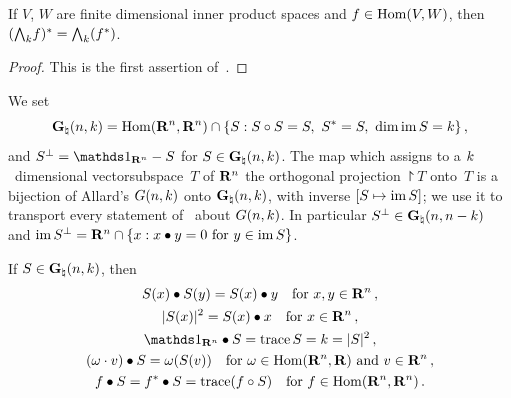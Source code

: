 \begin{lemma}
    \label{al:2.2(2)}
    If $V$, $W$ are finite dimensional inner product spaces and $f \in \operatorname{Hom}(V,W)$, then
    $({\textstyle\boldsymbol{\bigwedge}}_{{k}} f)^{*} = {\textstyle\boldsymbol{\bigwedge}}_{{k}} (f^{*})$.
\end{lemma}

\begin{proof}
    This is the first assertion of~\cite[1.7.6]{Federer1969}.
\end{proof}

\begin{definition}
    \label{al:2.3}
    We set
    \begin{displaymath}
        \mathbf{G}_{\natural}(n,k) = \operatorname{Hom}(\mathbf{R}^{n},\mathbf{R}^{n}) \cap \{ S : S \circ S = S,\
        S^{*} = S,\ \dim \operatorname{im} S = k \} \,,
    \end{displaymath}
    and $S^\perp = \id{\R^{\adim}} - S$ for $S \in \mathbf{G}_{\natural}(n,k)$. The map which assigns
    to a $k$~dimensional vectorsubspace~$T$ of $\mathbf{R}^{n}$ the orthogonal projection
    $\project{T}$ onto~$T$ is a bijection of Allard's $G(n,k)$ onto
    $\mathbf{G}_{\natural}(n,k)$, with inverse $[S \mapsto \operatorname{im} S]$; we use it to transport every
    statement of~\cite{Allard1972} about $G(n,k)$. In particular $S^\perp \in
    \mathbf{G}_{\natural}(n,n-k)$ and $\operatorname{im} S^\perp = \mathbf{R}^{n} \cap \{ x : x \bullet y = 0
    \text{ for } y \in \operatorname{im} S \}$.
\end{definition}

\begin{lemma}
    \label{al:2.3(1)}
    If $S \in \mathbf{G}_{\natural}(n,k)$, then
    \begin{gather}
        \label{eq:2.3:1}
        S(x) \bullet S(y) = S(x) \bullet y \quad \text{for $x, y \in \R^{\adim}$} \,, \\
        \label{eq:2.3:2}
        |S(x)|^2 = S(x) \bullet x \quad \text{for $x \in \R^{\adim}$} \,, \\
        \label{eq:2.3:3}
        \id{\R^{\adim}} \bullet S = \trace S = \vdim = |S|^2 \,, \\
        \label{eq:2.3:4}
        (\omega \cdot v) \bullet S = \omega(S(v)) \quad \text{for $\omega \in
        \Hom(\R^{\adim},\R)$ and $v \in \R^{\adim}$} \,, \\
        \label{eq:2.3:5}
        f \bullet S = \transpose{f} \bullet S = \trace(f \circ S) \quad \text{for $f \in
        \Hom(\R^{\adim},\R^{\adim})$} \,.
    \end{gather}
\end{lemma}

